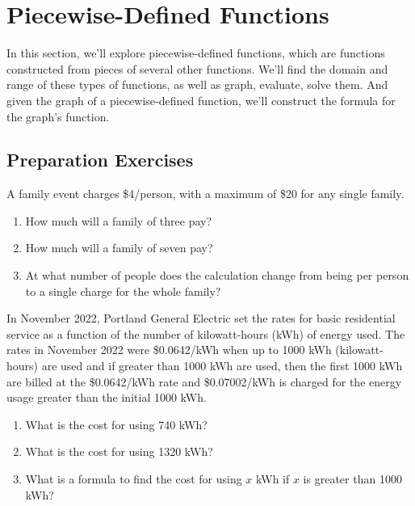 

\section{Piecewise-Defined Functions} \label{functions-piecewise}

In this section, we'll explore piecewise-defined functions, which are functions constructed from pieces of several other functions.  We'll find the domain and range of these types of functions, as well as graph, evaluate, solve them.  And given the graph of a piecewise-defined function, we'll construct the formula for the graph's function. \\[0.5em]




\subsection*{Preparation Exercises} \label{prep-functions-piecewise}

\begin{myPrep}
A family event charges \$4/person, with a maximum of \$20 for any single family.  
	\begin{enumerate}
		\item How much will a family of three pay?
		\vfill
		\item How much will a family of seven pay?
		\vfill
		\item At what number of people does the calculation change from being per person to a single charge for the whole family?
		\vfill
		\vfill
	\end{enumerate}
\end{myPrep}

\begin{myPrep}
In November 2022, Portland General Electric set the rates for basic residential service as a function of the number of kilowatt-hours (kWh) of energy used.  The rates in November 2022 were \$0.0642/kWh when up to 1000 kWh (kilowatt-hours) are used and if greater than 1000 kWh are used, then the first 1000 kWh are billed at the \$0.0642/kWh rate and \$0.07002/kWh is charged for the energy usage greater than the initial 1000 kWh.  
	\begin{enumerate}
		\item What is the cost for using 740 kWh?
		\vfill
		\item What is the cost for using 1320 kWh?
		\vfill
		\item What is a formula to find the cost for using $x$ kWh if $x$ is greater than 1000 kWh?
		\vfill
		\vfill
	\end{enumerate}
\end{myPrep}


